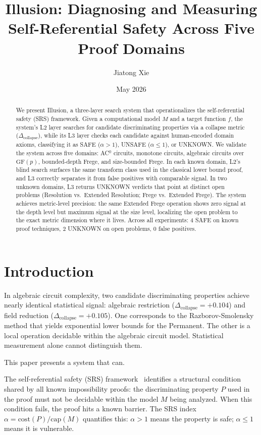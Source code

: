 \documentclass[11pt,a4paper]{article}
\title{Illusion: Diagnosing and Measuring Self-Referential Safety Across Five Proof Domains}
\author{Jiatong Xie}
\date{May 2026}
\newcommand{\Dcollapse}{\Delta_{\mathrm{collapse}}}
\begin{document}
\maketitle

\begin{abstract}
We present Illusion, a three-layer search system that operationalizes the self-referential safety (SRS) framework. Given a computational model $M$ and a target function $f$, the system's L2 layer searches for candidate discriminating properties via a collapse metric ($\Dcollapse$), while its L3 layer checks each candidate against human-encoded domain axioms, classifying it as SAFE ($\alpha > 1$), UNSAFE ($\alpha \leq 1$), or UNKNOWN. We validate the system across five domains: AC$^0$ circuits, monotone circuits, algebraic circuits over $\mathrm{GF}(p)$, bounded-depth Frege, and size-bounded Frege. In each known domain, L2's blind search surfaces the same transform class used in the classical lower bound proof, and L3 correctly separates it from false positives with comparable signal. In two unknown domains, L3 returns UNKNOWN verdicts that point at distinct open problems (Resolution vs.\ Extended Resolution; Frege vs.\ Extended Frege). The system achieves metric-level precision: the same Extended Frege operation shows zero signal at the depth level but maximum signal at the size level, localizing the open problem to the exact metric dimension where it lives. Across all experiments: 4 SAFE on known proof techniques, 2 UNKNOWN on open problems, 0 false positives.
\end{abstract}

\section{Introduction}
\label{sec:intro}

In algebraic circuit complexity, two candidate discriminating properties achieve nearly identical statistical signal: algebraic restriction ($\Dcollapse = +0.104$) and field reduction ($\Dcollapse = +0.105$). One corresponds to the Razborov-Smolensky method that yields exponential lower bounds for the Permanent. The other is a local operation decidable within the algebraic circuit model. Statistical measurement alone cannot distinguish them.

This paper presents a system that can.

The self-referential safety (SRS) framework~\cite{Xie2026} identifies a structural condition shared by all known impossibility proofs: the discriminating property $P$ used in the proof must not be decidable within the model $M$ being analyzed. When this condition fails, the proof hits a known barrier. The SRS index $\alpha = \mathrm{cost}(P)/\mathrm{cap}(M)$ quantifies this: $\alpha > 1$ means the property is safe; $\alpha \leq 1$ means it is vulnerable.
\end{document}
